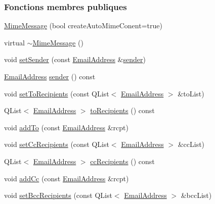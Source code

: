 \subsubsection*{Fonctions membres publiques}
\begin{DoxyCompactItemize}
\item 
\hyperlink{class_simple_mail_1_1_mime_message_a3ab61502fa784f8aebdacbec4a86ce49}{Mime\+Message} (bool create\+Auto\+Mime\+Conent=true)
\item 
virtual \hyperlink{class_simple_mail_1_1_mime_message_ae5005458f2bf64ad5255b8d12e0a324c}{$\sim$\+Mime\+Message} ()
\item 
void \hyperlink{class_simple_mail_1_1_mime_message_ab3bd73dba6b0a49443bcdd6d9e603319}{set\+Sender} (const \hyperlink{class_simple_mail_1_1_email_address}{Email\+Address} \&\hyperlink{class_simple_mail_1_1_mime_message_a626953414e4eed9e57ea793eb60a2d6b}{sender})
\item 
\hyperlink{class_simple_mail_1_1_email_address}{Email\+Address} \hyperlink{class_simple_mail_1_1_mime_message_a626953414e4eed9e57ea793eb60a2d6b}{sender} () const
\item 
void \hyperlink{class_simple_mail_1_1_mime_message_ac1f8b71260b9f2ac07505526b3c516b2}{set\+To\+Recipients} (const Q\+List$<$ \hyperlink{class_simple_mail_1_1_email_address}{Email\+Address} $>$ \&to\+List)
\item 
Q\+List$<$ \hyperlink{class_simple_mail_1_1_email_address}{Email\+Address} $>$ \hyperlink{class_simple_mail_1_1_mime_message_a1e3c4cf44d48b95f8436d251d19ffcb2}{to\+Recipients} () const
\item 
void \hyperlink{class_simple_mail_1_1_mime_message_ae49bed2a8717ed6cacdb66f2570c2740}{add\+To} (const \hyperlink{class_simple_mail_1_1_email_address}{Email\+Address} \&rcpt)
\item 
void \hyperlink{class_simple_mail_1_1_mime_message_afc2867c3922e5d3766ff46168799285f}{set\+Cc\+Recipients} (const Q\+List$<$ \hyperlink{class_simple_mail_1_1_email_address}{Email\+Address} $>$ \&cc\+List)
\item 
Q\+List$<$ \hyperlink{class_simple_mail_1_1_email_address}{Email\+Address} $>$ \hyperlink{class_simple_mail_1_1_mime_message_a69cf7d797c2405f31f50c6959c00a12f}{cc\+Recipients} () const
\item 
void \hyperlink{class_simple_mail_1_1_mime_message_a3fe778b09344f89f9b83b6d95ed5ce83}{add\+Cc} (const \hyperlink{class_simple_mail_1_1_email_address}{Email\+Address} \&rcpt)
\item 
void \hyperlink{class_simple_mail_1_1_mime_message_a7d0c5bf41385cfc09619f61391f0ddb8}{set\+Bcc\+Recipients} (const Q\+List$<$ \hyperlink{class_simple_mail_1_1_email_address}{Email\+Address} $>$ \&bcc\+List)

\end{DoxyCompactItemize}
